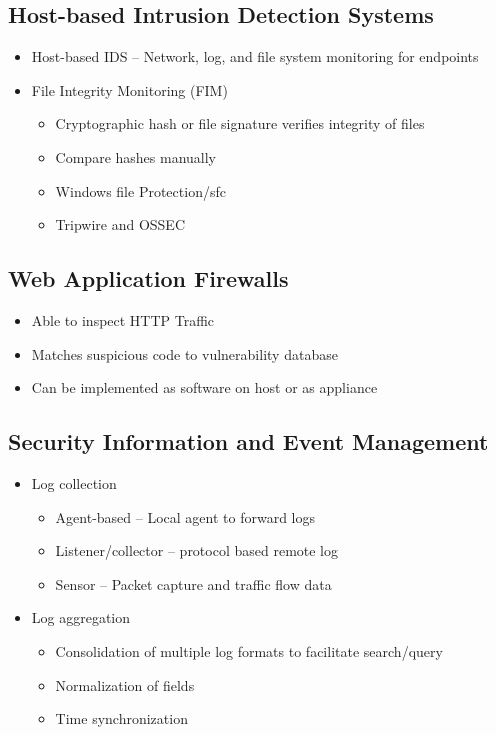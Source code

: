 	\subsection {Host-based Intrusion Detection Systems}
		\begin{itemize}
			\item Host-based IDS -- Network, log, and file system monitoring for endpoints
			\item File Integrity Monitoring (FIM)
				\begin{itemize}
					\item Cryptographic hash or file signature verifies integrity of files
					\item Compare hashes manually
					\item Windows file Protection/sfc
					\item Tripwire and OSSEC
				\end{itemize}
		\end{itemize}
	\subsection {Web Application Firewalls}
		\begin{itemize}
			\item Able to inspect HTTP Traffic
			\item Matches suspicious code to vulnerability database
			\item Can be implemented as software on host or as appliance
		\end{itemize}
	\subsection {Security Information and Event Management}
		\begin{itemize}
			\item Log collection
				\begin{itemize}
					\item Agent-based -- Local agent to forward logs
					\item Listener/collector -- protocol based remote log
					\item Sensor -- Packet capture and traffic flow data
				\end{itemize}
			\item Log aggregation
				\begin{itemize}
					\item Consolidation of multiple log formats to facilitate search/query
					\item Normalization of fields
					\item Time synchronization
				\end{itemize}
		\end{itemize}
